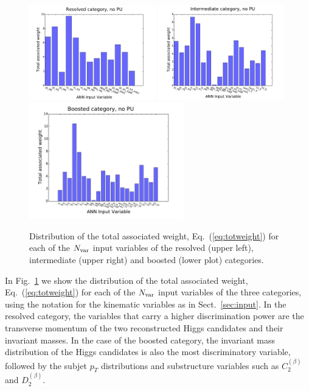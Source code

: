 \begin{figure}[t]
  \begin{center}
    \includegraphics[width=0.49\textwidth]{plots/res_wgthist_noPU.pdf}
\includegraphics[width=0.49\textwidth]{plots/int_wgthist_noPU.pdf}
\includegraphics[width=0.60\textwidth]{plots/bst_wgthist_noPU.pdf}
\vspace{-0.5cm}
\caption{\small
Distribution of the total associated weight,
Eq.~(\ref{eq:totweight}) for each of the $N_{\rm var}$ input
variables of the resolved (upper left),  intermediate (upper right)
and boosted (lower plot)
categories.
}
\label{fig:nnweights}
\end{center}
\end{figure}

%
In Fig.~\ref{fig:nnweights} we show
the distribution of the total associated weight,
Eq.~(\ref{eq:totweight}) for each of the $N_{\rm var}$ input
variables of the three categories, using the
notation for the kinematic variables
as in Sect.~\ref{sec:input}.
%
In the 
resolved category, the variables that carry 
a higher discrimination power
are the transverse momentum of the two reconstructed Higgs candidates and
their invariant masses.
%
In the case of the boosted category, the invariant mass distribution
of the Higgs candidates is also the most discriminatory
variable, followed by the subjet $p_T$ distributions and
substructure variables such as $C_2^{(\beta)}$ and
$D_2^{(\beta)}$.

